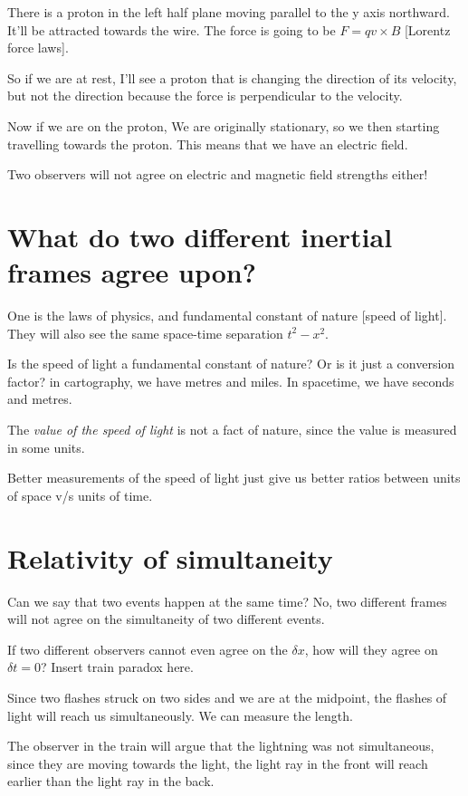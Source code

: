 \documentclass[11pt]{book}
\begin{document}
There is a proton in the left half plane moving parallel
to the y axis northward. It'll be attracted towards the wire.
The force is going to be $F = qv \times B$ [Lorentz force laws].

So if we are at rest, I'll see a proton that is changing the direction of its
velocity, but not the direction because the force is perpendicular to the
velocity.

Now if we are on the proton, We are originally stationary, so we then starting
travelling towards the proton. This means that we have an electric field.

Two observers will not agree on electric and magnetic field strengths either!


\section{What do two different inertial frames agree upon?}
One is the laws of physics, and fundamental constant of nature [speed of light].
They will also see the same space-time separation $t^2 - x^2$.

Is the speed of light a fundamental constant of nature? Or is it just a
conversion factor? in cartography, we have metres and miles. In spacetime,
we have seconds and metres.

The \emph{value of the speed of light} is not a fact of nature, since the value
is measured in some units. 

Better measurements of the speed of light just give us better ratios between
units of space v/s units of time.

\section{Relativity of simultaneity}

Can we say that two events happen at the same time? No, two different frames
will not agree on the simultaneity of two different events.


If two different observers cannot even agree on the $\delta x$, how will they
agree on $\delta t = 0$? Insert train paradox here.


Since two flashes struck on two sides and we are at the midpoint, the flashes
of light will reach us simultaneously. We can measure the length.


The observer in the train will argue that the lightning was not simultaneous,
since they are moving towards the light, the light ray in the front will reach
earlier than the light ray in the back.
\end{document}
